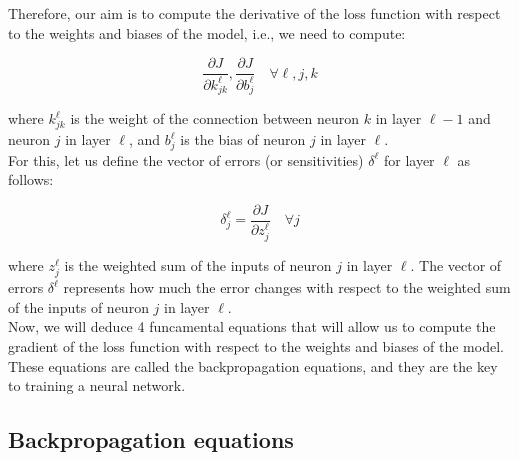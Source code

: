 Therefore, our aim is to compute the derivative of the loss function with respect
to the weights and biases of the model, i.e., we need to compute:

\begin{equation}
    \frac{\partial J}{\partial k^\ell_{jk}}, \frac{\partial J}{\partial b^\ell_j} \quad \forall \ell, j, k
\end{equation}

where $k^\ell_{jk}$ is the weight of the connection between neuron $k$ in layer $\ell-1$
and neuron $j$ in layer $\ell$, and $b^\ell_j$ is the bias of neuron $j$ in layer $\ell$.\\

For this, let us define the vector of errors (or sensitivities) $\delta^\ell$ for 
layer $\ell$ as follows:

\begin{equation}
    \delta^\ell_j = \frac{\partial J}{\partial z^\ell_j} \quad \forall j
\end{equation}

where $z^\ell_j$ is the weighted sum of the inputs of neuron $j$ in layer $\ell$.
The vector of errors $\delta^\ell$ represents how much the error changes with respect
to the weighted sum of the inputs of neuron $j$ in layer $\ell$.\\

Now, we will deduce 4 funcamental equations that will allow us to compute the
gradient of the loss function with respect to the weights and biases of the model.
These equations are called the backpropagation equations, and they are the key
to training a neural network.\\

\subsection{Backpropagation equations}

